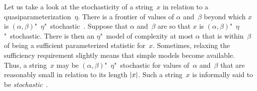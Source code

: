 Let us take a look at the stochasticity of a string~$x$ in relation to a quasiparameterization~$\eta$.
There is a frontier of values of $\alpha$ and~$\beta$ beyond which $x$ is $(\alpha, \beta)$"~$\eta$"~stochastic~\parencite{vereshchagin2004kolmogorov,gacs2001algorithmic}.
Suppose that $\alpha$ and~$\beta$ are so that $x$ is $(\alpha, \beta)$"~$\eta$"~stochastic.
There is then an $\eta$"~model of complexity at most $\alpha$ that is within~$\beta$ of being a sufficient parameterized statistic for~$x$.
Sometimes, relaxing the sufficiency requirement slightly means that simple models become available.
Thus, a string~$x$ may be $(\alpha, \beta)$"~$\eta$"~stochastic for values of~$\alpha$ and~$\beta$ that are reasonably small in relation to its length ${\lvert x\rvert}$.
Such a string~$x$ is informally said to be \emph{stochastic}~\parencite{vereshchagin2017algorithmic}.

